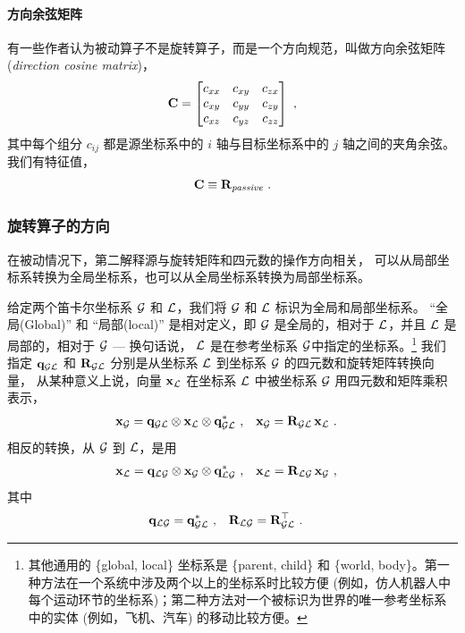 \paragraph{方向余弦矩阵}
有一些作者认为被动算子不是旋转算子，而是一个方向规范，叫做方向余弦矩阵(\emph{direction cosine matrix})，
%
\begin{align}
{\bf C} = \begin{bmatrix}
c_{xx} & c_{xy} & c_{zx} \\
c_{xy} & c_{yy} & c_{zy} \\
c_{xz} & c_{yz} & c_{zz} 
\end{bmatrix}
~,
\end{align}
%
其中每个组分 $c_{ij}$ 都是源坐标系中的 $i$ 轴与目标坐标系中的 $j$ 轴之间的夹角余弦。我们有特征值，
%
\begin{align}
{\bf C} \equiv {\bf R}_{\textit{passive}}
~.
\end{align}


\subsubsection{旋转算子的方向}

在被动情况下，第二解释源与旋转矩阵和四元数的操作方向相关， 
可以从局部坐标系转换为全局坐标系，也可以从全局坐标系转换为局部坐标系。 

给定两个笛卡尔坐标系 $\mathcal{G}$ 和 $\mathcal{L}$，我们将 $\mathcal{G}$ 和 $\mathcal{L}$ 标识为全局和局部坐标系。
``全局(Global)'' 和 ``局部(local)'' 是相对定义，即 $\mathcal{G}$ 是全局的，相对于 $\mathcal{L}$，并且 $\mathcal{L}$ 是局部的，相对于 $\mathcal{G}$ --- 换句话说， $\mathcal{L}$ 是在参考坐标系 $\mathcal{G}$中指定的坐标系。\footnote{其他通用的 \{global, local\} 坐标系是 \{parent, child\} 和 \{world, body\}。第一种方法在一个系统中涉及两个以上的坐标系时比较方便 (例如，仿人机器人中每个运动环节的坐标系)；第二种方法对一个被标识为世界的唯一参考坐标系中的实体 (例如，飞机、汽车) 的移动比较方便。} 
我们指定 ${\bf q}_{\mathcal{G}\mathcal{L}}$ 和 ${\bf R}_{\mathcal{G}\mathcal{L}}$ 分别是从坐标系 $\mathcal{L}$ 到坐标系 $\mathcal{G}$ 的四元数和旋转矩阵转换向量， 
从某种意义上说，向量 ${\bf x}_{\mathcal{L}}$ 在坐标系 $\mathcal{L}$ 中被坐标系 $\mathcal{G}$ 用四元数和矩阵乘积表示，
%
\begin{align}
{\bf x}_{\mathcal{G}} &= {\bf q}_{\mathcal{G}\mathcal{L}}\otimes{\bf x}_{\mathcal{L}}\otimes{\bf q}_{\mathcal{G}\mathcal{L}}^*~, &
{\bf x}_{\mathcal{G}} &= {\bf R}_{\mathcal{G}\mathcal{L}}\,{\bf x}_{\mathcal{L}}~.
\label{equ:local_to_global}
\end{align}
%
相反的转换，从 $\mathcal{G}$ 到 $\mathcal{L}$，是用
%
\begin{align}
{\bf x}_{\mathcal{L}} &= {\bf q}_{\mathcal{L}\mathcal{G}}\otimes{\bf x}_{\mathcal{G}}\otimes{\bf q}_{\mathcal{L}\mathcal{G}}^*
~,
&
{\bf x}_{\mathcal{L}} &= {\bf R}_{\mathcal{L}\mathcal{G}}\,{\bf x}_{\mathcal{G}}~,
\end{align}
%
其中
%
\begin{align}
{\bf q}_{\mathcal{L}\mathcal{G}} &= {\bf q}_{\mathcal{G}\mathcal{L}}^*~,
& 
{\bf R}_{\mathcal{L}\mathcal{G}} &= {\bf R}_{\mathcal{G}\mathcal{L}}^{\top}~. \label{equ:localVsGlobal}
\end{align}


